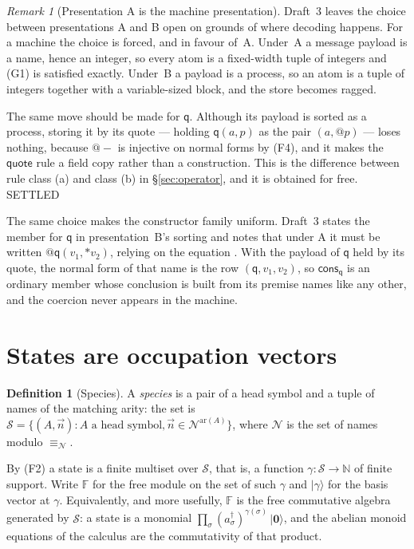 \documentclass[11pt,a4paper]{article}
\makeatletter
\theoremstyle{plain}
\theoremstyle{definition}
\newtheorem{definition}[theorem]{Definition}
\theoremstyle{remark}
\newtheorem{remark}[theorem]{Remark}
\newcommand{\quo}[1]{@#1}
\newcommand{\drp}[1]{{*}#1}
\newcommand{\nil}{\mathbf{0}}
\newcommand{\nequiv}{\equiv_{\mathcal{N}}}
\newcommand{\qq}{\mathsf{q}}
\newcommand{\cons}{\mathsf{cons}}
\newcommand{\Spec}{\mathcal{S}}
\newcommand{\Nm}{\mathcal{N}}
\newcommand{\Fock}{\mathbb{F}}
\newcommand{\cre}[1]{a^{\dagger}_{#1}}
\makeatother
\begin{document}
\begin{remark}[Presentation A is the machine presentation]
\label{rem:AforA}
Draft~3 leaves the choice between presentations A and B open on grounds of
where decoding happens. For a machine the choice is forced, and in favour
of~A. Under~A a message payload is a name, hence an integer, so every atom is
a fixed-width tuple of integers and (G1) is satisfied exactly. Under~B a
payload is a process, so an atom is a tuple of integers together with a
variable-sized block, and the store becomes ragged.

The same move should be made for $\qq$. Although its payload is sorted as a
process, storing it by its quote --- holding $\qq(a,p)$ as the pair
$(a, \quo{p})$ --- loses nothing, because $\quo{-}$ is injective on normal
forms by (F4), and it makes the $\mathsf{quote}$ rule a field copy rather than
a construction. This is the difference between rule class (a) and class (b) in
\S\ref{sec:operator}, and it is obtained for free. \textsf{SETTLED}

The same choice makes the constructor family uniform. Draft~3 states the
member for $\qq$ in presentation~B's sorting and notes that under A it must be
written $\quo{\qq(v_{1},\drp{v_{2}})}$, relying on the equation
\cite[Rem.~3.9]{rhocomb3}. With the payload of $\qq$ held by its quote, the
normal form of that name is the row $(\qq, v_{1}, v_{2})$, so $\cons_{\qq}$
is an ordinary member whose conclusion is built from its premise names like
any other, and the coercion never appears in the machine.
\end{remark}

\section{States are occupation vectors}
\label{sec:states}

\begin{definition}[Species]
\label{def:species}
A \emph{species} is a pair of a head symbol and a tuple of names of the
matching arity: the set is
$\Spec = \{ (A, \vec{n}) : A \text{ a head symbol}, \vec{n} \in
\Nm^{\mathrm{ar}(A)} \}$, where $\Nm$ is the set of names modulo $\nequiv$.
\end{definition}

By (F2) a state is a finite multiset over $\Spec$, that is, a function
$\gamma : \Spec \to \mathbb{N}$ of finite support. Write $\Fock$ for the free
module on the set of such $\gamma$ and $|\gamma\rangle$ for the basis vector
at $\gamma$. Equivalently, and more usefully, $\Fock$ is the free commutative
algebra generated by $\Spec$: a state is a monomial
$\prod_{\sigma} (\cre{\sigma})^{\gamma(\sigma)}\,|\nil\rangle$, and the abelian
monoid equations of the calculus are the commutativity of that product.
\end{document}
